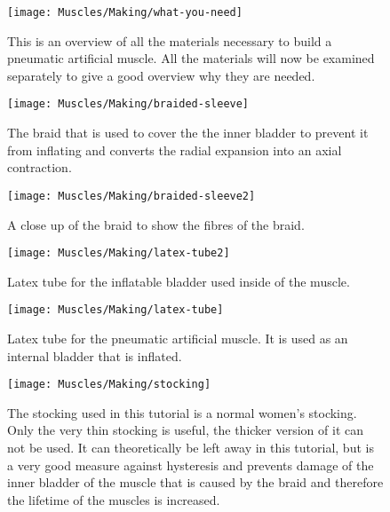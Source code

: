 \documentclass[main]{subfiles}
\begin{document}
\begin{figure}[H]
\centering
\texttt{[image: Muscles/Making/what-you-need]}
\caption[Required materials and tools]{This is an overview of all the materials necessary to build a pneumatic artificial muscle. All the materials will now be examined separately to give a good overview why they are needed.}
\label{what-you-need}
\end{figure}

\begin{figure}[H]
\centering
\texttt{[image: Muscles/Making/braided-sleeve]}
\caption[Braided sleeving]{The braid that is used to cover the the inner bladder to prevent it from inflating and converts the radial expansion into an axial contraction.}
\label{braided-sleeve}
\end{figure}

\begin{figure}[H]
\centering
\texttt{[image: Muscles/Making/braided-sleeve2]}
\caption[Close up of the braid]{A close up of the braid to show the fibres of the braid.}
\label{braided-sleeve2}
\end{figure}

\begin{figure}[H]
\centering
\texttt{[image: Muscles/Making/latex-tube2]}
\caption[Latex tubing]{Latex tube for the inflatable bladder used inside of the muscle.}
\label{latex-tube}
\end{figure}

\begin{figure}[H]
\centering
\texttt{[image: Muscles/Making/latex-tube]}
\caption[Latex tube for PAM]{Latex tube for the pneumatic artificial muscle. It is used as an internal bladder that is inflated.}
\label{latex-tube2}
\end{figure}

\begin{figure}[H]
\centering
\texttt{[image: Muscles/Making/stocking]}
\caption[Women's stocking]{The stocking used in this tutorial is a normal women's stocking. Only the very thin stocking is useful, the thicker version of it can not be used. It can theoretically be left away in this tutorial, but is a very good measure against hysteresis and prevents damage of the inner bladder of the muscle that is caused by the braid and therefore the lifetime of the muscles is increased.}
\label{stocking}
\end{figure}
\end{document}
